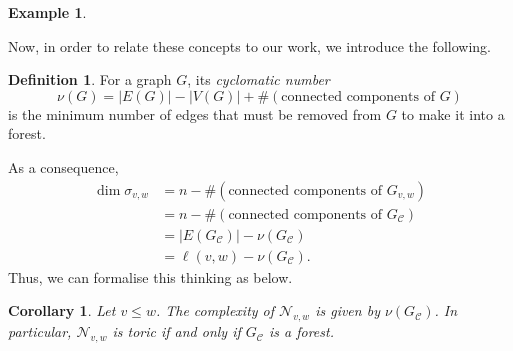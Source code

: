 \documentclass[11pt]{amsart}
\newtheorem{corollary}[theorem]{Corollary}
\theoremstyle{definition}
\newtheorem{example}[theorem]{Example}
\theoremstyle{definition}
\newtheorem{definition}[theorem]{Definition}
\theoremstyle{definition}
\theoremstyle{definition}
\newcommand{\Nvw}{\mathcal{N}_{v,w}}
\newcommand{\cn}{\nu}
\newcommand{\GC}{G_{\mathcal C}}
\begin{document}
\begin{example}
\begin{minipage}{0.45\textwidth}
\end{minipage}
\begin{minipage}{0.45\textwidth}
\hspace{0.5cm}
\end{minipage}
\end{example}

\noindent Now, in order to relate these concepts to our work, we introduce the following.
\begin{definition}\label{defn:cycnumb}
    For a graph $G$, its \emph{cyclomatic number}
    $$\cn (G) = |E(G)| - |V(G)| + \#(\text{connected components of }G)$$
    is the minimum number of edges that must be removed from $G$ to make it into a forest.
\end{definition}

\noindent As a consequence, 
\begin{align*}
    \dim \sigma_{v,w} &= n- \#(\textrm{connected components of } G_{v,w}) \\
    &= n- \#(\textrm{connected components of } G_{\mathcal C}) \\
    &= |E(G_{\mathcal C})| - \cn(G_{\mathcal C}) \\
    &= \ell(v,w) - \cn(G_{\mathcal C}).
\end{align*}
Thus, we can formalise this thinking as below.
\begin{corollary}
    Let $v \leq w$. The complexity of $\Nvw$ is given by $\cn(\GC)$. In particular, $\Nvw$ is toric if and only if $\GC$ is a forest.
\end{corollary}
\end{document}
